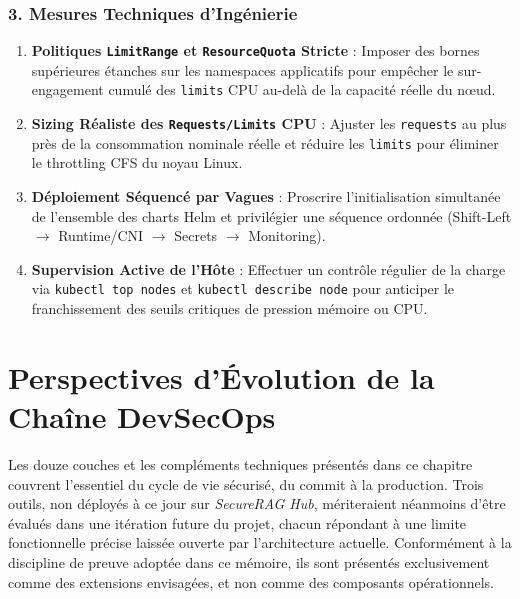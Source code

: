 \subsubsection{3. Mesures Techniques d'Ingénierie}
\begin{enumerate}
    \item \textbf{Politiques \texttt{LimitRange} et \texttt{ResourceQuota} Stricte} : Imposer des bornes supérieures étanches sur les namespaces applicatifs pour empêcher le sur-engagement cumulé des \texttt{limits} CPU au-delà de la capacité réelle du nœud.
    \item \textbf{Sizing Réaliste des \texttt{Requests/Limits} CPU} : Ajuster les \texttt{requests} au plus près de la consommation nominale réelle et réduire les \texttt{limits} pour éliminer le throttling CFS du noyau Linux.
    \item \textbf{Déploiement Séquencé par Vagues} : Proscrire l'initialisation simultanée de l'ensemble des charts Helm et privilégier une séquence ordonnée (Shift-Left $\rightarrow$ Runtime/CNI $\rightarrow$ Secrets $\rightarrow$ Monitoring).
    \item \textbf{Supervision Active de l'Hôte} : Effectuer un contrôle régulier de la charge via \texttt{kubectl top nodes} et \texttt{kubectl describe node} pour anticiper le franchissement des seuils critiques de pression mémoire ou CPU.
\end{enumerate}



\section{Perspectives d'Évolution de la Chaîne DevSecOps}
\label{sec:perspectives_evolution_outils}

Les douze couches et les compléments techniques présentés dans ce chapitre couvrent l'essentiel du cycle de vie sécurisé, du commit à la production. Trois outils, non déployés à ce jour sur \textit{SecureRAG Hub}, mériteraient néanmoins d'être évalués dans une itération future du projet, chacun répondant à une limite fonctionnelle précise laissée ouverte par l'architecture actuelle. Conformément à la discipline de preuve adoptée dans ce mémoire, ils sont présentés exclusivement comme des extensions envisagées, et non comme des composants opérationnels.

